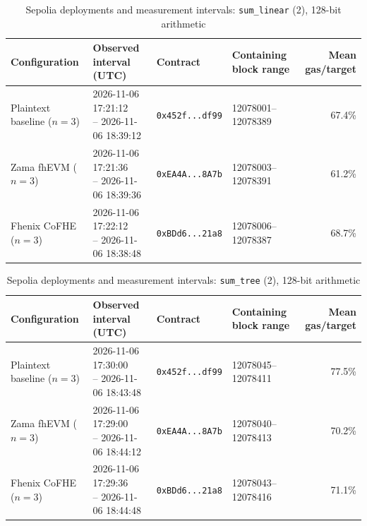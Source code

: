 \begin{table}[!t]
\caption{Sepolia deployments and measurement intervals: \texttt{sum\_linear} (2), 128-bit arithmetic}
\label{tab:sepolia-experiment-deployments-circuits-euint128-circuits-w128-sum-linear-n2}
\centering
\footnotesize
\setlength{\tabcolsep}{4pt}
\begin{tabular}{|l|l|l|l|r|}
\hline
\textbf{Configuration} &
\textbf{Observed interval (UTC)} &
\textbf{Contract} &
\textbf{Containing block range} &
\textbf{Mean gas/target} \\
\hline
Plaintext baseline (\(n=3\)) &
\shortstack[l]{2026-11-06 17:21:12 \\ -- 2026-11-06 18:39:12} &
\texttt{0x452f...df99} &
12078001--12078389 &
67.4\% \\
\hline
Zama fhEVM (\(n=3\)) &
\shortstack[l]{2026-11-06 17:21:36 \\ -- 2026-11-06 18:39:36} &
\texttt{0xEA4A...8A7b} &
12078003--12078391 &
61.2\% \\
\hline
Fhenix CoFHE (\(n=3\)) &
\shortstack[l]{2026-11-06 17:22:12 \\ -- 2026-11-06 18:38:48} &
\texttt{0xBDd6...21a8} &
12078006--12078387 &
68.7\% \\
\hline
\end{tabular}
\end{table}

\begin{table}[!t]
\caption{Sepolia deployments and measurement intervals: \texttt{sum\_tree} (2), 128-bit arithmetic}
\label{tab:sepolia-experiment-deployments-circuits-euint128-circuits-w128-sum-tree-n2}
\centering
\footnotesize
\setlength{\tabcolsep}{4pt}
\begin{tabular}{|l|l|l|l|r|}
\hline
\textbf{Configuration} &
\textbf{Observed interval (UTC)} &
\textbf{Contract} &
\textbf{Containing block range} &
\textbf{Mean gas/target} \\
\hline
Plaintext baseline (\(n=3\)) &
\shortstack[l]{2026-11-06 17:30:00 \\ -- 2026-11-06 18:43:48} &
\texttt{0x452f...df99} &
12078045--12078411 &
77.5\% \\
\hline
Zama fhEVM (\(n=3\)) &
\shortstack[l]{2026-11-06 17:29:00 \\ -- 2026-11-06 18:44:12} &
\texttt{0xEA4A...8A7b} &
12078040--12078413 &
70.2\% \\
\hline
Fhenix CoFHE (\(n=3\)) &
\shortstack[l]{2026-11-06 17:29:36 \\ -- 2026-11-06 18:44:48} &
\texttt{0xBDd6...21a8} &
12078043--12078416 &
71.1\% \\
\hline
\end{tabular}
\end{table}

